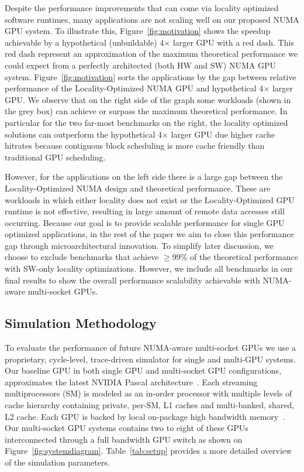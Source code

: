 Despite the performance improvements that can come via locality optimized 
software runtimes, many applications are not scaling well on our proposed NUMA 
GPU system. To illustrate this, Figure~\ref{fig:motivation} shows the speedup 
achievable by a hypothetical (unbuildable) 4$\times$ larger GPU with 
a red dash. This red dash represent an approximation of the 
maximum theoretical performance we could expect from a perfectly architected 
(both HW and SW) NUMA GPU system. Figure~\ref{fig:motivation} sorts the 
applications by the gap between relative performance of the Locality-Optimized 
NUMA GPU and hypothetical 4$\times$ larger GPU. We observe that on the right 
side of the graph some workloads (shown in the grey box) can achieve or surpass 
the maximum theoretical performance. In particular for the two far-most 
benchmarks on the right, the locality optimized solutions can outperform the 
hypothetical 4$\times$ larger GPU due higher cache hitrates because contiguous block 
scheduling is more cache friendly than traditional GPU scheduling.

However, for the applications on the left side there is a large gap between the 
Locality-Optimized NUMA design and theoretical performance. These are workloads 
in which either locality does not exist or the Locality-Optimized GPU runtime is 
not effective, resulting in large amount of remote data accesses still 
occurring.  Because our goal is to provide scalable performance for single GPU 
optimized applications, in the rest of the paper we aim to close this 
performance gap through microarchitectural innovation. To simplify later 
discussion, we choose to exclude benchmarks that achieve $\geq$99\% of the 
theoretical performance with SW-only locality optimizations. However, we include 
all benchmarks in our final results to show the overall performance scalability 
achievable with NUMA-aware multi-socket GPUs.
 
 \vspace{-.1in}
\subsection{Simulation Methodology}
\label{sec:methodology}

To evaluate the performance of future NUMA-aware multi-socket GPUs we use a 
proprietary, cycle-level, trace-driven simulator for single and multi-GPU 
systems. Our baseline GPU in both single GPU and multi-socket GPU 
configurations, approximates the latest NVIDIA Pascal 
architecture~\cite{pascal-tesla-wp}. Each streaming multiprocessors (SM) is 
modeled as an in-order processor with multiple levels of cache hierarchy 
containing private, per-SM, L1 caches and multi-banked, shared, L2 cache. Each 
GPU is backed by local on-package high bandwidth memory~\cite{HBM}. Our 
multi-socket GPU systems contains two to eight of these GPUs interconnected 
through a full bandwidth GPU switch as shown on Figure~\ref{fig:systemdiagram}. 
Table~\ref{tab:setup} provides a more detailed overview of the simulation 
parameters.

